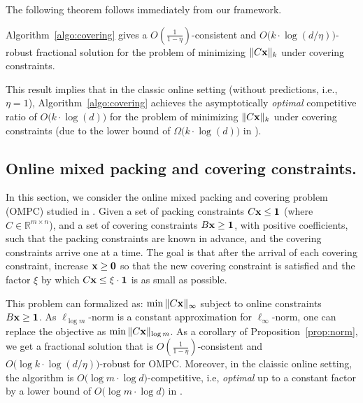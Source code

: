 The following theorem follows immediately from our framework.

\begin{proposition}	\label{prop:norm}
Algorithm~\ref{algo:covering} gives a
$O(\frac{1}{1 - \eta})$-consistent and $O\bigl( k \cdot \log (d/\eta)\bigr)$-robust fractional solution
for the problem of minimizing $\|C \mathbf{x}\|_{k}$ under covering constraints.
\end{proposition}

This result implies that in the classic online setting (without predictions, i.e., $\eta = 1$), Algorithm~\ref{algo:covering} 
achieves the asymptotically \emph{optimal} competitive ratio of  $O\bigl( k \cdot \log (d)\bigr)$ 
for the problem of minimizing $\|C \mathbf{x}\|_{k}$ under covering constraints (due to the lower bound 
of $\Omega\bigl( k \cdot \log (d)\bigr)$ in \cite{AzarCohen14:Online-Covering}).

\subsection{Online mixed packing and covering constraints.}
In this section, we consider the online mixed packing and covering problem (OMPC) studied in \cite{AzarBhaskar13:Online-mixed}. 
Given a set of packing constraints $C \mathbf{x} \leq \mathbf{1}$ (where $C \in \mathbb{R}^{m \times n}$), 
and a set of covering constraints $B \mathbf{x} \geq \mathbf{1}$, with positive coefficients, 
such that the packing constraints are known in advance, and the covering constraints arrive one at a time. 
The goal is that after the arrival of each
covering constraint, increase $\mathbf{x} \geq \mathbf{0}$ so that the new covering constraint is satisfied and the factor $\xi$
by which $C \mathbf{x} \leq \xi \cdot \mathbf{1}$ is as small as possible.

This problem can formalized as: $\min \| C \mathbf{x}\|_{\infty}$ subject to online constraints $B \mathbf{x} \geq \mathbf{1}$. 
As $\ell_{\log m}$-norm is a constant approximation for $\ell_{\infty}$-norm, one can replace the objective as $\min \| C \mathbf{x}\|_{\log m}$. 
As a corollary of Proposition~\ref{prop:norm}, we get a fractional solution that is 
$O(\frac{1}{1 - \eta})$-consistent and $O\bigl( \log k \cdot \log (d/\eta)\bigr)$-robust for OMPC. 
Moreover, in the claissic online setting, the algorithm is $O\bigl( \log m \cdot \log d \bigr)$-competitive, i.e, \emph{optimal} up to a constant factor 
by a lower bound of $O\bigl( \log m \cdot \log d \bigr)$ in \cite{AzarBhaskar13:Online-mixed}.
